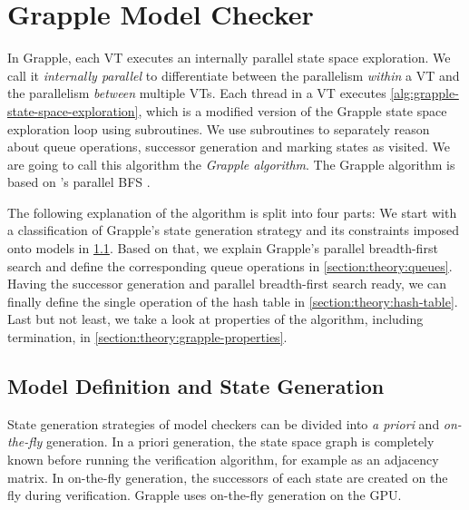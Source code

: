 \documentclass[
fancyheadings, %
%
%
]{stsreprt}
\begin{document}
\section{Grapple Model Checker}
\label{section:theory:grapple-model-checker}

In Grapple, each VT executes an internally parallel state space exploration.
We call it \emph{internally parallel} to differentiate between the parallelism \emph{within} a VT and the parallelism \emph{between} multiple VTs.
Each thread in a VT executes \cref{alg:grapple-state-space-exploration}, which is a modified version of the Grapple state space exploration loop \cite[Algorithm 1]{DeFrancisco2020.Grapple} using subroutines.
We use subroutines to separately reason about queue operations, successor generation and marking states as visited.
We are going to call this algorithm the \emph{Grapple algorithm}.
The Grapple algorithm is based on \citeauthor*{Holzmann2012.Paralellizing-SPIN}'s parallel BFS \cite{Holzmann2012.Paralellizing-SPIN}.

The following explanation of the algorithm is split into four parts:
We start with a classification of Grapple's state generation strategy and its constraints imposed onto models in \cref{section:theory:model-definition-state-generation}.
Based on that, we explain Grapple's parallel breadth-first search and define the corresponding queue operations in \cref{section:theory:queues}.
Having the successor generation and parallel breadth-first search ready, we can finally define the single operation of the hash table in \cref{section:theory:hash-table}.
Last but not least, we take a look at properties of the algorithm, including termination, in \cref{section:theory:grapple-properties}.

\subsection{Model Definition and State Generation}
\label{section:theory:model-definition-state-generation}


State generation strategies of model checkers can be divided into \emph{a priori} and \emph{on-the-fly} generation.
In a priori generation, the state space graph is completely known before running the verification algorithm, for example as an adjacency matrix.
In on-the-fly generation, the successors of each state are created on the fly during verification.
Grapple uses on-the-fly generation on the GPU.
\end{document}
